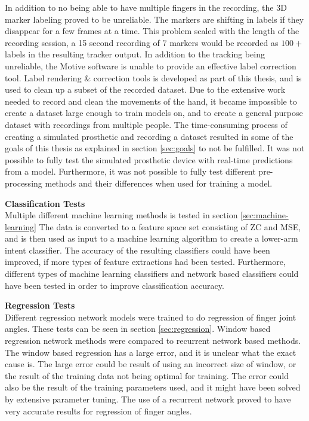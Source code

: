 \documentclass[../main.tex]{subfiles}
\begin{document}
In addition to no being able to have multiple fingers in the recording, the 3D marker labeling proved to be unreliable.
The markers are shifting in labels if they disappear for a few frames at a time.
This problem scaled with the length of the recording session, a 15 second recording of 7 markers would be recorded as $100+$ labels in the resulting tracker output.
In addition to the tracking being unreliable, the Motive software is unable to provide an effective label correction tool.
Label rendering \& correction tools is developed as part of this thesis, and is used to clean up a subset of the recorded dataset.
Due to the extensive work needed to record and clean the movements of the hand, it became impossible to create a dataset large enough to train models on, and to create a general purpose dataset with recordings from multiple people. 
The time-consuming process of creating a simulated prosthetic and recording a dataset resulted in some of the goals of this thesis as explained in section \ref{sec:goals} to not be fulfilled.
It was not possible to fully test the simulated prosthetic device with real-time predictions from a model. 
Furthermore, it was not possible to fully test different pre-processing methods and their differences when used for training a model.


\textbf{Classification Tests}\\
Multiple different machine learning methods is tested in section  \ref{sec:machine-learning}
The data is converted to a feature space set consisting of \gls{ZC} and \gls{MSE}, and is then used as input to a machine learning algorithm to create a lower-arm intent classifier.
The accuracy of the resulting classifiers could have been improved, if more types of feature extractions had been tested.
Furthermore, different types of machine learning classifiers and network based classifiers could have been tested in order to improve classification accuracy.

\textbf{Regression Tests}\\
Different regression network models were trained to do regression of finger joint angles. These tests can be seen in section \ref{sec:regression}.
Window based regression network methods were compared to recurrent network based methods.
The window based regression has a large error, and it is unclear what the exact cause is.
The large error could be result of using an incorrect size of window, or the result of the training data not being optimal for training.
The error could also be the result of the training parameters used, and it might have been solved by extensive parameter tuning.
The use of a recurrent network proved to have very accurate results for regression of finger angles.
\end{document}
